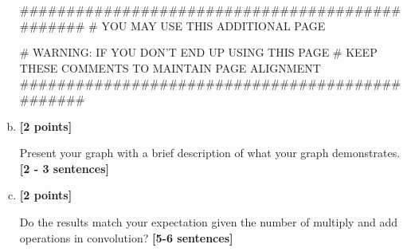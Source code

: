 \documentclass[11pt]{article}
\begin{document}
\begin{enumerate}[(a)]
\begin{tcolorbox}[enhanced jigsaw,breakable,pad at break*=1mm,colback=white!5!white,colframe=green!75!black,height fixed for=all]
\begin{python}
################################################
# YOU MAY USE THIS ADDITIONAL PAGE

# WARNING: IF YOU DON'T END UP USING THIS PAGE
# KEEP THESE COMMENTS TO MAINTAIN PAGE ALIGNMENT
################################################

\end{python}


\end{tcolorbox}
    \item \textbf{[2 points]}
    \begin{tcolorbox}[colback=orange!5!white,colframe=orange!75!black]
    Present your graph with a brief description of what your graph demonstrates. \textbf{[2 - 3 sentences]}
    \end{tcolorbox}

    

\item \textbf{[2 points]} 
\begin{tcolorbox}[colback=orange!5!white,colframe=orange!75!black]
Do the results match your expectation given the number of multiply and add operations in convolution? \textbf{[5-6 sentences]}
\end{tcolorbox}
    

\end{enumerate}
\end{document}
